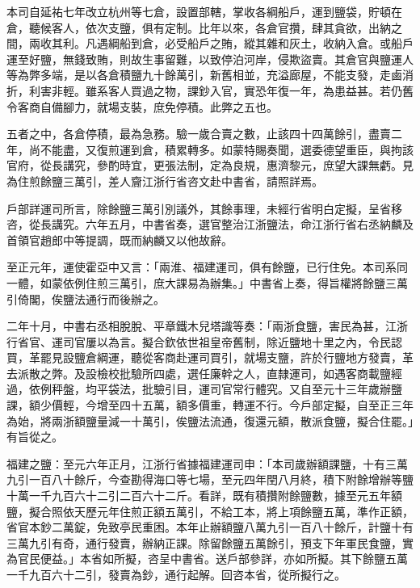 \begin{pinyinscope}
 本司自延祐七年改立杭州等七倉，設置部轄，掌收各綱船戶，運到鹽袋，貯頓在倉，聽候客人，依次支鹽，俱有定制。比年以來，各倉官攢，肆其貪欲，出納之間，兩收其利。凡遇綱船到倉，必受船戶之賄，縱其雜和灰土，收納入倉。或船戶運至好鹽，無錢致賄，則故生事留難，以致停泊河岸，侵欺盜賣。其倉官與鹽運人等為弊多端，是以各倉積鹽九十餘萬引，新舊相並，充溢廊屋，不能支發，走鹵消折，利害非輕。雖系客人買過之物，課鈔入官，實恐年復一年，為患益甚。若仍舊令客商自備腳力，就場支裝，庶免停積。此弊之五也。



 五者之中，各倉停積，最為急務。驗一歲合賣之數，止該四十四萬餘引，盡賣二年，尚不能盡，又復煎運到倉，積累轉多。如蒙特賜奏聞，選委德望重臣，與拘該官府，從長講究，參酌時宜，更張法制，定為良規，惠濟黎元，庶望大課無虧。見為住煎餘鹽三萬引，差人齎江浙行省咨文赴中書省，請照詳焉。



 戶部詳運司所言，除餘鹽三萬引別議外，其餘事理，未經行省明白定擬，呈省移咨，從長講究。六年五月，中書省奏，選官整治江浙鹽法，命江浙行省右丞納麟及首領官趙郎中等提調，既而納麟又以他故辭。



 至正元年，運使霍亞中又言：「兩淮、福建運司，俱有餘鹽，已行住免。本司系同一體，如蒙依例住煎三萬引，庶大課易為辦集。」中書省上奏，得旨權將餘鹽三萬引倚閣，俟鹽法通行而後辦之。



 二年十月，中書右丞相脫脫、平章鐵木兒塔識等奏：「兩浙食鹽，害民為甚，江浙行省官、運司官屢以為言。擬合欽依世祖皇帝舊制，除近鹽地十里之內，令民認買，革罷見設鹽倉綱運，聽從客商赴運司買引，就場支鹽，許於行鹽地方發賣，革去派散之弊。及設檢校批驗所四處，選任廉幹之人，直隸運司，如遇客商載鹽經過，依例秤盤，均平袋法，批驗引目，運司官常行體究。又自至元十三年歲辦鹽課，額少價輕，今增至四十五萬，額多價重，轉運不行。今戶部定擬，自至正三年為始，將兩浙額鹽量減一十萬引，俟鹽法流通，復還元額，散派食鹽，擬合住罷。」有旨從之。



 福建之鹽：至元六年正月，江浙行省據福建運司申：「本司歲辦額課鹽，十有三萬九引一百八十餘斤，今查勘得海口等七場，至元四年閏八月終，積下附餘增辦等鹽十萬一千九百六十二引二百六十二斤。看詳，既有積攢附餘鹽數，據至元五年額鹽，擬合照依天歷元年住煎正額五萬引，不給工本，將上項餘鹽五萬，準作正額，省官本鈔二萬錠，免致亭民重困。本年止辦額鹽八萬九引一百八十餘斤，計鹽十有三萬九引有奇，通行發賣，辦納正課。除留餘鹽五萬餘引，預支下年軍民食鹽，實為官民便益。」本省如所擬，咨呈中書省。送戶部參詳，亦如所擬。其下餘鹽五萬一千九百六十二引，發賣為鈔，通行起解。回咨本省，從所擬行之。




\end{pinyinscope}
